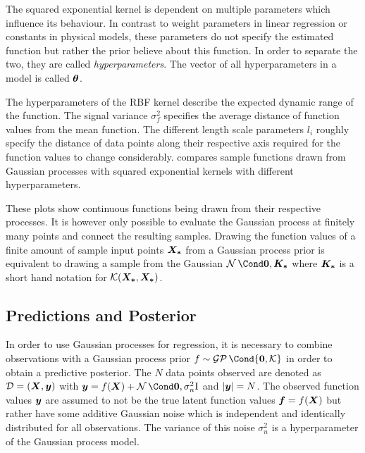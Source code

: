 The squared exponential kernel is dependent on multiple parameters which influence its behaviour.
In contrast to weight parameters in linear regression or constants in physical models, these parameters do not specify the estimated function but rather the prior believe about this function.
In order to separate the two, they are called \emph{hyperparameters}.
The vector of all hyperparameters in a model is called $\bm{\theta}$.

The hyperparameters of the RBF kernel describe the expected dynamic range of the function.
The signal variance $\sigma_f^2$ specifies the average distance of function values from the mean function.
The different length scale parameters $l_i$ roughly specify the distance of data points along their respective axis required for the function values to change considerably.
 compares sample functions drawn from Gaussian processes with squared exponential kernels with different hyperparameters.

These plots show continuous functions being drawn from their respective processes.
It is however only possible to evaluate the Gaussian process at finitely many points and connect the resulting samples.
Drawing the function values of a finite amount of sample input points $\bm{X_\ast}$ from a Gaussian process prior is equivalent to drawing a sample from the Gaussian $\Gaussian{\mat{0}, \mat{K_\ast}}$ where $\bm{K_\ast}$ is a short hand notation for $\operatorname{\mathcal{K}}(\bm{X_\ast}, \bm{X_\ast})$.

\subsection{Predictions and Posterior}
In order to use Gaussian processes for regression, it is necessary to combine observations with a Gaussian process prior $f \sim \GP\Cond{\mat{0}, \K}$ in order to obtain a predictive posterior.
The $N$ data points observed are denoted as $\mathcal{D} = \left( \bm{X}, \bm{y} \right)$ with $\mat{y} = f(\mat{X}) + \Gaussian{\mat{0}, \sigma_n^2 \Eye}$ and $\vert\bm{y}\vert = N$.
The observed function values $\bm{y}$ are assumed to not be the true latent function values $\bm{f} = f(\bm{X})$ but rather have some additive Gaussian noise which is independent and identically distributed for all observations.
The variance of this noise $\sigma_n^2$ is a hyperparameter of the Gaussian process model.

